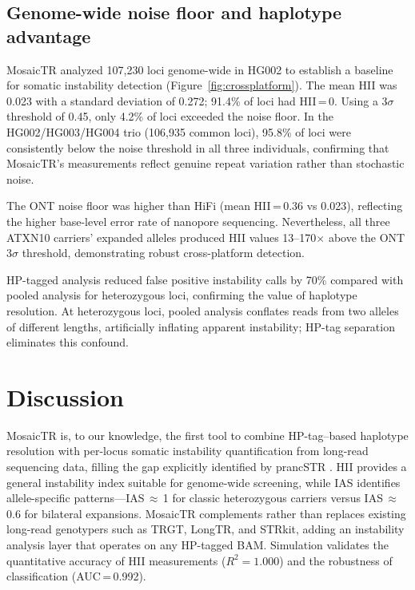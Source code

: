 \documentclass[12pt]{article}
\begin{document}
\subsection{Genome-wide noise floor and haplotype advantage}

MosaicTR analyzed 107{,}230 loci genome-wide in HG002 to establish a baseline for somatic instability detection (Figure~\ref{fig:crossplatform}).
The mean HII was 0.023 with a standard deviation of 0.272; 91.4\% of loci had HII\,=\,0.
Using a 3$\sigma$ threshold of 0.45, only 4.2\% of loci exceeded the noise floor.
In the HG002/HG003/HG004 trio (106{,}935 common loci), 95.8\% of loci were consistently below the noise threshold in all three individuals, confirming that MosaicTR's measurements reflect genuine repeat variation rather than stochastic noise.

The ONT noise floor was higher than HiFi (mean HII\,=\,0.36 vs 0.023), reflecting the higher base-level error rate of nanopore sequencing.
Nevertheless, all three ATXN10 carriers' expanded alleles produced HII values 13--170$\times$ above the ONT 3$\sigma$ threshold, demonstrating robust cross-platform detection.

HP-tagged analysis reduced false positive instability calls by 70\% compared with pooled analysis for heterozygous loci, confirming the value of haplotype resolution.
At heterozygous loci, pooled analysis conflates reads from two alleles of different lengths, artificially inflating apparent instability; HP-tag separation eliminates this confound.

\section{Discussion}

MosaicTR is, to our knowledge, the first tool to combine HP-tag--based haplotype resolution with per-locus somatic instability quantification from long-read sequencing data, filling the gap explicitly identified by prancSTR \citep{sehgal2024}.
HII provides a general instability index suitable for genome-wide screening, while IAS identifies allele-specific patterns---IAS\,$\approx$\,1 for classic heterozygous carriers versus IAS\,$\approx$\,0.6 for bilateral expansions.
MosaicTR complements rather than replaces existing long-read genotypers such as TRGT, LongTR, and STRkit, adding an instability analysis layer that operates on any HP-tagged BAM.
Simulation validates the quantitative accuracy of HII measurements ($R^2 = 1.000$) and the robustness of classification (AUC\,=\,0.992).
\end{document}
